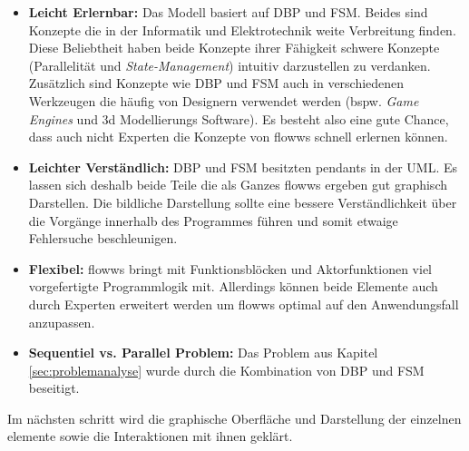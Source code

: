 \begin{itemize}
    \item \textbf{Leicht Erlernbar:} Das Modell basiert auf \ac{DBP} und \ac{FSM}. Beides sind Konzepte die in der Informatik und Elektrotechnik weite Verbreitung finden. Diese Beliebtheit haben beide Konzepte ihrer Fähigkeit schwere Konzepte (Parallelität und \textit{State-Management}) intuitiv darzustellen zu verdanken. Zusätzlich sind Konzepte wie \ac{DBP} und \ac{FSM} auch in verschiedenen Werkzeugen die häufig von Designern verwendet werden (bspw. \textit{Game Engines} und 3d Modellierungs Software). Es besteht also eine gute Chance, dass auch nicht Experten die Konzepte von flowws schnell erlernen können.
    \item \textbf{Leichter Verständlich:} \ac{DBP} und \ac{FSM} besitzten pendants in der UML. Es lassen sich deshalb beide Teile die als Ganzes flowws ergeben gut graphisch Darstellen. Die bildliche Darstellung sollte eine bessere Verständlichkeit über die Vorgänge innerhalb des Programmes führen und somit etwaige Fehlersuche beschleunigen.
    \item \textbf{Flexibel:} flowws bringt mit Funktionsblöcken und Aktorfunktionen viel vorgefertigte Programmlogik mit. Allerdings können beide Elemente auch durch Experten erweitert werden um flowws optimal auf den Anwendungsfall anzupassen.
    \item \textbf{Sequentiel vs. Parallel Problem:} Das Problem aus Kapitel \ref{sec:problemanalyse} wurde durch die Kombination von \ac{DBP} und \ac{FSM} beseitigt.
\end{itemize}

Im nächsten schritt wird die graphische Oberfläche und Darstellung der einzelnen elemente sowie die Interaktionen mit ihnen geklärt.